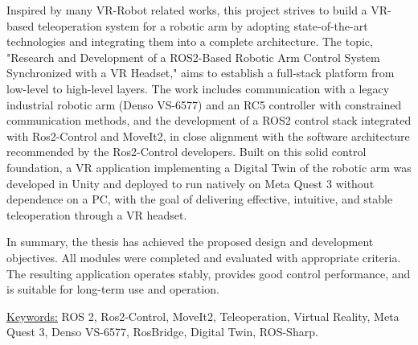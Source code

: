 Inspired by many VR-Robot related works, this project strives to build a VR-based teleoperation system for a robotic arm by adopting state-of-the-art technologies and integrating them into a complete architecture. The topic, "Research and Development of a ROS2-Based Robotic Arm Control System Synchronized with a VR Headset," aims to establish a full-stack platform from low-level to high-level layers. The work includes communication with a legacy industrial robotic arm (Denso VS-6577) and an RC5 controller with constrained communication methods, and the development of a ROS2 control stack integrated with Ros2-Control and MoveIt2, in close alignment with the software architecture recommended by the Ros2-Control developers. Built on this solid control foundation, a VR application implementing a Digital Twin of the robotic arm was developed in Unity and deployed to run natively on Meta Quest 3 without dependence on a PC, with the goal of delivering effective, intuitive, and stable teleoperation through a VR headset.

In summary, the thesis has achieved the proposed design and development objectives. All modules were completed and evaluated with appropriate criteria. The resulting application operates stably, provides good control performance, and is suitable for long-term use and operation.

\underline{Keywords:} ROS 2, Ros2-Control, MoveIt2, Teleoperation, Virtual Reality, Meta Quest 3, Denso VS-6577, RosBridge, Digital Twin, ROS-Sharp.
